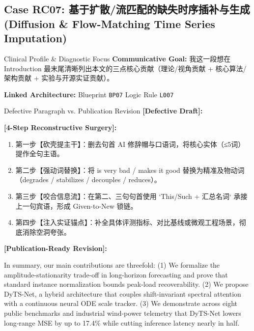 \subsection{Case RC07: 基于扩散/流匹配的缺失时序插补与生成 (Diffusion \& Flow-Matching Time Series Imputation)}\label{case:RC07}
\begin{ConceptBox}{Clinical Profile \& Diagnostic Focus}
\textbf{Communicative Goal:} 我这一段想在 Introduction 最末尾清晰列出本文的三点核心贡献（理论/视角贡献 + 核心算法/架构贡献 + 实验与开源实证贡献）。\par
\textbf{Linked Architecture:} Blueprint \texttt{BP07} \enspace\textbar\enspace Logic Rule \texttt{L007}
\end{ConceptBox}
\begin{ExampleBox}{Defective Paragraph vs. Publication Revision}
\textbf{\color{TargetHighlight}[Defective Draft]:}\par
{}\par\vspace{6pt}
\textbf{\color{AcadForest}[4-Step Reconstructive Surgery]:}
\begin{enumerate}[label=\textbf{\color{AcadNavy}Step \arabic*:}, leftmargin=2em]
  \item 第一步【砍壳提主干】：删去句首 AI 修辞帽与口语词，将核心实体（≤5词）提作全句主语。
  \item 第二步【强动词替换】：将 is very bad / makes it good 替换为精准及物动词（degrades / stabilizes / decouples / reduces）。
  \item 第三步【咬合信息流】：在第二、三句句首使用 `This/Such + 汇总名词` 承接上一句宾语，形成 Given-to-New 锁链。
  \item 第四步【注入实证锚点】：补全具体评测指标、对比基线或微观工程场景，彻底消除空洞夸张。
\end{enumerate}\vspace{4pt}
\textbf{\color{AcadNavy}[Publication-Ready Revision]:}\par
In summary, our main contributions are threefold: (1) We formalize the amplitude-stationarity trade-off in long-horizon forecasting and prove that standard instance normalization bounds peak-load recoverability. (2) We propose DyTS-Net, a hybrid architecture that couples shift-invariant spectral attention with a continuous neural ODE scale tracker. (3) We demonstrate across eight public benchmarks and industrial wind-power telemetry that DyTS-Net lowers long-range MSE by up to 17.4\% while cutting inference latency nearly in half.
\end{ExampleBox}
